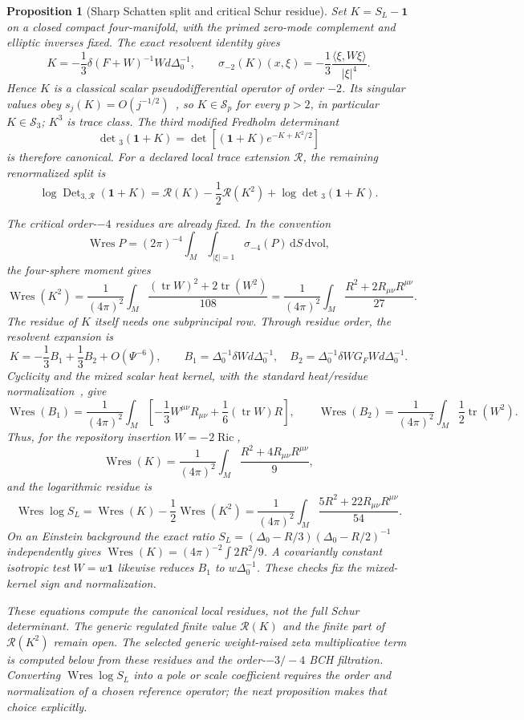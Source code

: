 \documentclass[11pt]{article}
\newtheorem{proposition}[theorem]{Proposition}
\theoremstyle{definition}
\theoremstyle{remark}
\newcommand{\dd}{\mathrm d}
\begin{document}
\begin{proposition}[Sharp Schatten split and critical Schur residue]
Set $K=S_L-\mathbf1$ on a closed compact four-manifold, with the primed
zero-mode complement and elliptic inverses fixed.  The exact resolvent
identity gives
\[
 K=-\frac13\delta(F+W)^{-1}Wd\Delta_0^{-1},
 \qquad
 \sigma_{-2}(K)(x,\xi)
 =-\frac13\frac{\langle\xi,W\xi\rangle}{|\xi|^4}.
\]
Hence $K$ is a classical scalar pseudodifferential operator of order $-2$.
Its singular values obey $s_j(K)=O(j^{-1/2})$~\cite{DelgadoRuzhansky}, so
$K\in\mathcal S_p$ for every $p>2$, in particular $K\in\mathcal S_3$;
$K^3$ is trace class.  The third modified Fredholm determinant
\cite{GesztesyLatushkinZumbrun}
\[
 \det{}_3(\mathbf1+K)
 =\det\!\left[(\mathbf1+K)e^{-K+K^2/2}\right]
\]
is therefore canonical.  For a declared local trace extension $\mathcal R$,
the remaining renormalized split is
\[
 \log\operatorname{Det}_{3,\mathcal R}(\mathbf1+K)
 =\mathcal R(K)-\frac12\mathcal R(K^2)
  +\log\det{}_3(\mathbf1+K).
\]

The critical order-$-4$ residues are already fixed.  In the convention
\[
 \operatorname{Wres}P=(2\pi)^{-4}\int_M\int_{|\xi|=1}
 \sigma_{-4}(P)\,\dd S\,\dd\mathrm{vol},
\]
the four-sphere moment gives
\[
 \operatorname{Wres}(K^2)
 =\frac1{(4\pi)^2}\int_M
 \frac{(\operatorname{tr}W)^2+2\operatorname{tr}(W^2)}{108}
 =\frac1{(4\pi)^2}\int_M
 \frac{R^2+2R_{\mu\nu}R^{\mu\nu}}{27}.
\]
The residue of $K$ itself needs one subprincipal row.  Through residue order,
the resolvent expansion is
\[
 K=-\frac13B_1+\frac13B_2+O(\Psi^{-6}),\qquad
 B_1=\Delta_0^{-1}\delta Wd\Delta_0^{-1},\quad
 B_2=\Delta_0^{-1}\delta W G_FWd\Delta_0^{-1}.
\]
Cyclicity and the mixed scalar heat kernel, with the standard heat/residue
normalization~\cite{AckermannWodzicki,VassilevichHeatKernel}, give
\[
 \operatorname{Wres}(B_1)=\frac1{(4\pi)^2}\int_M
 \left[-\frac13W^{\mu\nu}R_{\mu\nu}
       +\frac16(\operatorname{tr}W)R\right],
 \qquad
 \operatorname{Wres}(B_2)=\frac1{(4\pi)^2}\int_M
 \frac12\operatorname{tr}(W^2).
\]
Thus, for the repository insertion $W=-2\operatorname{Ric}$,
\[
 \operatorname{Wres}(K)=\frac1{(4\pi)^2}\int_M
 \frac{R^2+4R_{\mu\nu}R^{\mu\nu}}9,
\]
and the logarithmic residue is
\[
 \operatorname{Wres}\log S_L
 =\operatorname{Wres}(K)-\frac12\operatorname{Wres}(K^2)
 =\frac1{(4\pi)^2}\int_M
 \frac{5R^2+22R_{\mu\nu}R^{\mu\nu}}{54}.
\]
On an Einstein background the exact ratio
$S_L=(\Delta_0-R/3)(\Delta_0-R/2)^{-1}$ independently gives
$\operatorname{Wres}(K)=(4\pi)^{-2}\int 2R^2/9$.  A covariantly constant
isotropic test $W=w\mathbf1$ likewise reduces $B_1$ to $w\Delta_0^{-1}$.
These checks fix the mixed-kernel sign and normalization.

These equations compute the canonical local residues, not the full Schur
determinant.  The generic regulated finite value $\mathcal R(K)$ and the
finite part of $\mathcal R(K^2)$ remain open.  The selected generic
weight-raised zeta multiplicative term is computed below from these residues
and the order-$-3/-4$ BCH filtration.
Converting $\operatorname{Wres}\log S_L$ into a pole or scale coefficient
requires the order and normalization of a chosen reference operator; the next
proposition makes that choice explicitly.
\end{proposition}
\end{document}
